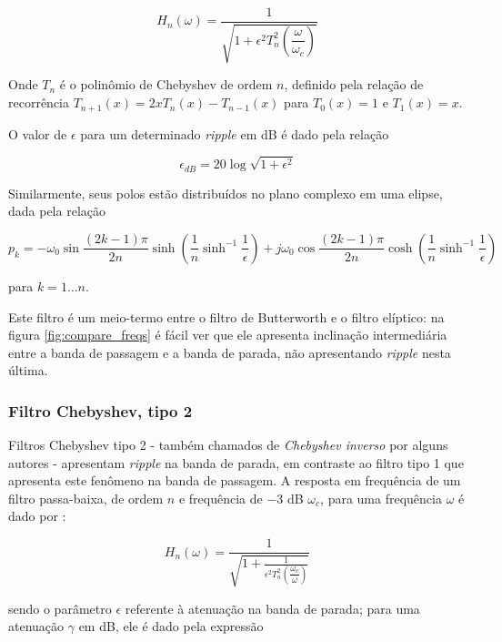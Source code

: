 \begin{equation}
H_n(\omega) = \dfrac{1}{\sqrt{1+\epsilon^2 T_n^2 (\dfrac{\omega}{\omega_c})}}
\label{eq:cheby1_tf}
\end{equation}

Onde $T_n$ é o polinômio de Chebyshev de ordem $n$, definido pela relação de recorrência $T_{n+1}(x) = 2 x T_{n}(x) - T_{n-1}(x)$ para $T_0(x) = 1$ e $T_1(x) = x$.

O valor de $\epsilon$ para um determinado \textit{ripple} em dB é dado pela relação 

\begin{equation}
\epsilon_{dB} = 20 \log \sqrt{1+\epsilon^2}
\label{eq:cheby_ripple}
\end{equation}

Similarmente, seus polos estão distribuídos no plano complexo em uma elipse, dada pela relação

\begin{equation}
p_k = -\omega_0 \sin\frac{(2k-1)\pi}{2n} \sinh(\frac{1}{n} \sinh^{-1}\frac{1}{\epsilon}) + j\omega_0 \cos\frac{(2k-1)\pi}{2n} \cosh(\frac{1}{n} \sinh^{-1}\frac{1}{\epsilon})
\label{eq:cheby1_poles}
\end{equation}

para $k = 1 \dots n$.

Este filtro é um meio-termo entre o filtro de Butterworth e o filtro elíptico: na figura \ref{fig:compare_freqs} é fácil ver que ele apresenta inclinação intermediária entre a banda de passagem e a banda de parada, não apresentando \textit{ripple} nesta última.

\subsubsection{Filtro Chebyshev, tipo 2}
Filtros Chebyshev tipo 2 - também chamados de \textit{Chebyshev inverso} por alguns autores \cite{zumbalen} - apresentam \textit{ripple} na banda de parada, em contraste ao filtro tipo 1 que apresenta este fenômeno na banda de passagem. A resposta em frequência de um filtro passa-baixa, de ordem $n$ e frequência de $-3$ dB $\omega_c$, para uma frequência $\omega$ é dado por \cite{sedra_smith}:

\begin{equation}
H_n(\omega) = \dfrac{1}{\sqrt{1+\frac{1}{\epsilon^2 T_n^2 (\dfrac{\omega_c}{\omega})}}}
\label{eq:cheby2_tf}
\end{equation}

sendo o parâmetro $\epsilon$ referente à atenuação na banda de parada; para uma atenuação $\gamma$ em dB, ele é dado pela expressão

